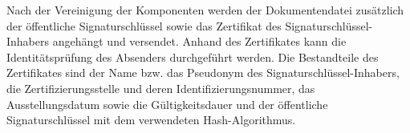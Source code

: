 Nach der Vereinigung der Komponenten werden der Dokumentendatei zusätzlich der öffentliche Signaturschlüssel sowie das Zertifikat des Signaturschlüssel-Inhabers angehängt und versendet. Anhand des Zertifikates kann die Identitätsprüfung des Absenders durchgeführt werden. Die Bestandteile des Zertifikates sind der Name bzw. das Pseudonym des Signaturschlüssel-Inhabers, die Zertifizierungsstelle und deren Identifizierungsnummer, das Ausstellungsdatum sowie die Gültigkeitsdauer und der öffentliche Signaturschlüssel mit dem verwendeten Hash-Algorithmus. \cite{techno1}\cite{techno4}